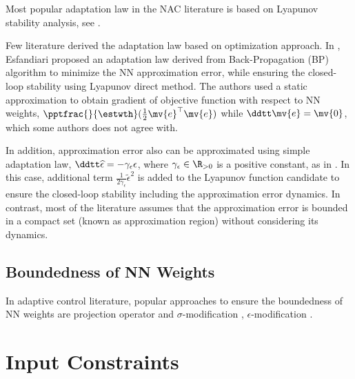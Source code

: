 Most popular adaptation law in the NAC literature is based on Lyapunov stability analysis, see \cite{Patil:2022aa}. 

\hfill

Few literature derived the adaptation law based on optimization approach.
In \cite{Esfandiari:2014aa,Esfandiari:2015aa}, Esfandiari \etal proposed an adaptation law derived from Back-Propagation (BP) algorithm to minimize the NN approximation error, while ensuring the closed-loop stability using Lyapunov direct method.
The authors used a static approximation to obtain gradient of objective function with respect to NN weights, $\pptfrac{}{\estwth}(\frac{1}{2}\mv{e}^\top\mv{e})$ while $\ddtt\mv{e}=\mv{0}$, which some authors does not agree with.

\hfill

In addition, approximation error also can be approximated using simple adaptation law, $\ddtt\widehat{\epsilon} = - \gamma_\epsilon \epsilon$, where $\gamma_\epsilon \in \R_{>0}$ is a positive constant, as in \cite{Zhao:2016aa}.
In this case, additional term $\tfrac{1}{2\gamma_\epsilon} \widetilde{\epsilon}^2$ is added to the Lyapunov function candidate to ensure the closed-loop stability including the approximation error dynamics.
In contrast, most of the literature assumes that the approximation error is bounded in a compact set (known as approximation region) without considering its dynamics.

\subsection{Boundedness of NN Weights}

In adaptive control literature, popular approaches to ensure the boundedness of NN weights are projection operator \cite{Patil:2022aa} and $\sigma$-modification \cite{He:2016aa,Gao:2006aa,Zhao:2016aa,Zhao:2025aa}, $\epsilon$-modification \cite{Esfandiari:2014aa,Esfandiari:2015aa,Zhao:2016aa}.

\section{Input Constraints}




